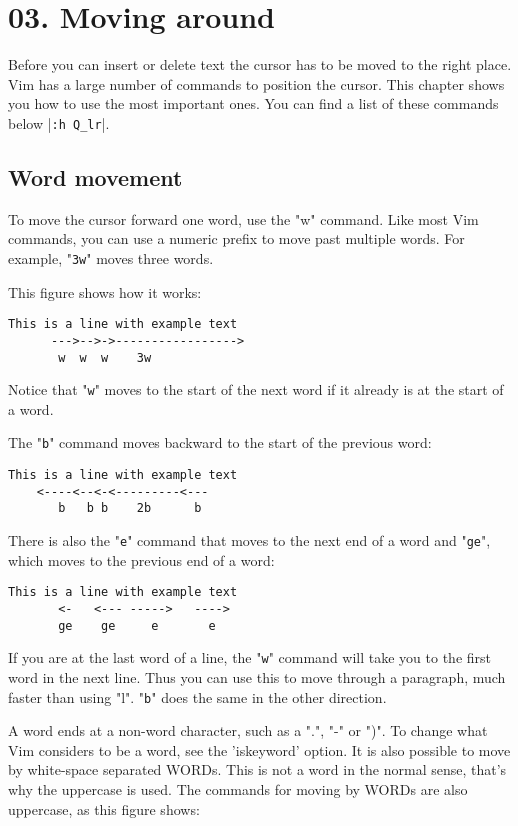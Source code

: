 \section{03. Moving around}
Before you can insert or delete text the cursor has to be moved to the right
place.  Vim has a large number of commands to position the cursor.  This
chapter shows you how to use the most important ones.  You can find a list of
these commands below |\verb!:h Q_lr!|.
\subsection{Word movement}

To move the cursor forward one word, use the "w" command.
Like most Vim commands, you can use a numeric prefix to move past multiple words.
For example, "\verb!3w!" moves three words.

This figure shows how it works:

		\begin{Verbatim}[samepage=true]
    This is a line with example text 
      --->-->->----------------->
       w  w  w    3w
		\end{Verbatim}

Notice that "\verb!w!" moves to the start of the next word if it already is at the start of a word.

The "\verb!b!" command moves backward to the start of the previous word:

		\begin{Verbatim}[samepage=true]
    This is a line with example text 
    <----<--<-<---------<---
       b   b b    2b      b
		\end{Verbatim}

There is also the "\verb!e!" command that moves to the next end of a word and "\verb!ge!", which moves to the previous end of a word:

		\begin{Verbatim}[samepage=true]
    This is a line with example text 
       <-   <--- ----->   ---->
       ge    ge     e       e
		\end{Verbatim}

If you are at the last word of a line, the "\verb!w!" command will take you to the first word in the next line.
Thus you can use this to move through a paragraph, much faster than using "l".
"\verb!b!" does the same in the other direction.

A word ends at a non-word character, such as a ".", "-" or ")".
To change what Vim considers to be a word, see the 'iskeyword' option.
It is also possible to move by white-space separated WORDs.
This is not a word in the normal sense, that's why the uppercase is used.
The commands for moving by WORDs are also uppercase, as this figure shows:

